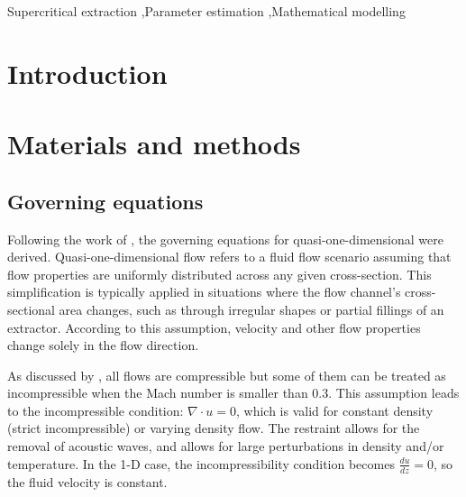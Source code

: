 \documentclass[a4paper,fleqn]{cas-dc}
\begin{document}
\begin{keywords}
Supercritical extraction \sep Parameter estimation \sep Mathematical modelling
\end{keywords}

\maketitle


\section{Introduction}


\section{Materials and methods} \label{CH: Materials and methods}

%

\subsection{Governing equations} \label{CH:Governing_equations_chapter}
	Following the work of \citet{Anderson1995}, the governing equations for quasi-one-dimensional were derived. Quasi-one-dimensional flow refers to a fluid flow scenario assuming that flow properties are uniformly distributed across any given cross-section. This simplification is typically applied in situations where the flow channel's cross-sectional area changes, such as through irregular shapes or partial fillings of an extractor. According to this assumption, velocity and other flow properties change solely in the flow direction.
	
	As discussed by \citet{Anderson2023}, all flows are compressible but some of them can be treated as incompressible when the Mach number is smaller than 0.3. This assumption leads to the incompressible condition: $\nabla \cdot u =0$, which is valid for constant density (strict incompressible) or varying density flow. The restraint allows for the removal of acoustic waves, and allows for large perturbations in density and/or temperature. In the 1-D case, the incompressibility condition becomes $\frac{du}{dz} = 0$, so the fluid velocity is constant.
	
\end{document}
